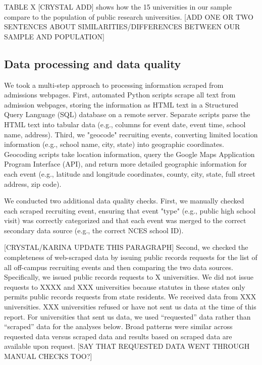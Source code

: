 \documentclass[twoside]{article}
\begin{document}
TABLE X [CRYSTAL ADD] shows how the 15 universities in our sample compare to the population of public research universities. [ADD ONE OR TWO SENTENCES ABOUT SIMILARITIES/DIFFERENCES BETWEEN OUR SAMPLE AND POPULATION]

\subsection*{Data processing and data quality}

We took a multi-step approach to processing information scraped from admissions webpages. First, automated Python scripts scrape all text from admission webpages, storing the information as HTML text in a Structured Query Language (SQL) database on a remote server. Separate scripts parse the HTML text into tabular data (e.g., columns for event date, event time, school name, address). Third, we "geocode" recruiting events, converting limited location information (e.g., school name, city, state) into geographic coordinates. Geocoding scripts take location information, query the Google Maps Application Program Interface (API), and return more detailed geographic information for each event (e.g., latitude and longitude coordinates, county, city, state, full street address, zip code).

We conducted two additional data quality checks. First, we manually checked each scraped recruiting event, ensuring that event "type" (e.g., public high school visit) was correctly categorized and that each event was merged to the correct secondary data source (e.g., the correct NCES school ID). 

[CRYSTAL/KARINA UPDATE THIS PARAGRAPH] Second, we checked the completeness of web-scraped data by issuing public records requests for the list of all off-campus recruiting events and then comparing the two data sources. Specifically, we issued public records requests to X universities. We did not issue requests to XXXX and XXX universities because statutes in these states only permits public records requests from state residents. We received data from XXX universities. XXX universities refused or have not sent us data at the time of this report. For universities that sent us data, we used ``requested'' data rather than ``scraped'' data for the analyses below. Broad patterns were similar across requested data versus scraped data and results based on scraped data are available upon request. [SAY THAT REQUESTED DATA WENT THROUGH MANUAL CHECKS TOO?]
\end{document}
